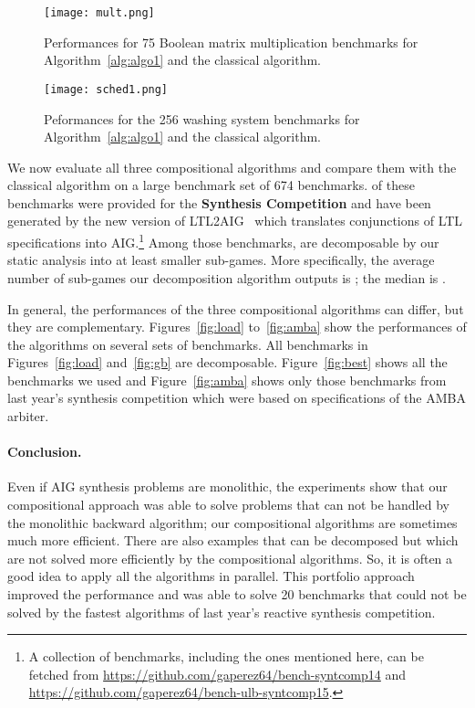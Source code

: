 \documentclass[submission,copyright,creativecommons]{eptcs}
\begin{document}
\begin{figure}[H]
  \begin{minipage}{0.43\textwidth}
    \begin{center}
      \texttt{[image: mult.png]}
      \caption{Performances for 75 Boolean matrix multiplication
        benchmarks for Algorithm~\ref{alg:algo1} and the classical algorithm.
      }
      \label{fig:mult}
    \end{center}
  \end{minipage}
  \qquad
  \begin{minipage}{0.43\textwidth}
    \begin{center}
      \texttt{[image: sched1.png]}
      \caption{Peformances for the 256 washing system benchmarks
      for Algorithm~\ref{alg:algo1} and the classical algorithm.}
      \label{fig:sched}
    \end{center}
  \end{minipage}
\end{figure}

We now evaluate all three compositional algorithms and compare them with the classical
algorithm on a large benchmark set of 674 benchmarks.
 of these benchmarks were provided for the \textbf{ Synthesis Competition}
and  have been generated by the new version of LTL2AIG~\cite{ltl2aig} which
translates conjunctions of LTL specifications into AIG.\footnote{A collection of benchmarks,
including the ones mentioned here, can be fetched from
\url{https://github.com/gaperez64/bench-syntcomp14}
and \url{https://github.com/gaperez64/bench-ulb-syntcomp15}.}
Among those benchmarks,  are decomposable by our static analysis into at
least  smaller sub-games. More specifically, the average number of sub-games our
decomposition algorithm outputs is ; the median is .

In general, the performances of the three compositional algorithms can differ,
but they are complementary.
Figures~\ref{fig:load} to~\ref{fig:amba} show the performances of the algorithms
on several sets of benchmarks. All benchmarks in
Figures~\ref{fig:load} and~\ref{fig:gb} are decomposable.  Figure~\ref{fig:best}
shows all the benchmarks we used and Figure~\ref{fig:amba} shows only those
benchmarks from last year's synthesis competition which were based on
specifications of the \textsf{AMBA} arbiter.


\paragraph{{\bf Conclusion.}} Even if AIG synthesis problems are monolithic, the
experiments show that our compositional approach was able to solve problems that
can not be handled by the monolithic backward algorithm; our compositional
algorithms are sometimes much more efficient. There are also examples that can
be decomposed but which are not solved more efficiently by the compositional
algorithms. So, it is often a good idea to apply all the algorithms in parallel.
This portfolio approach improved the performance and was able to solve 20
benchmarks that could not be solved by
the fastest algorithms of last year's reactive synthesis competition.
\end{document}
